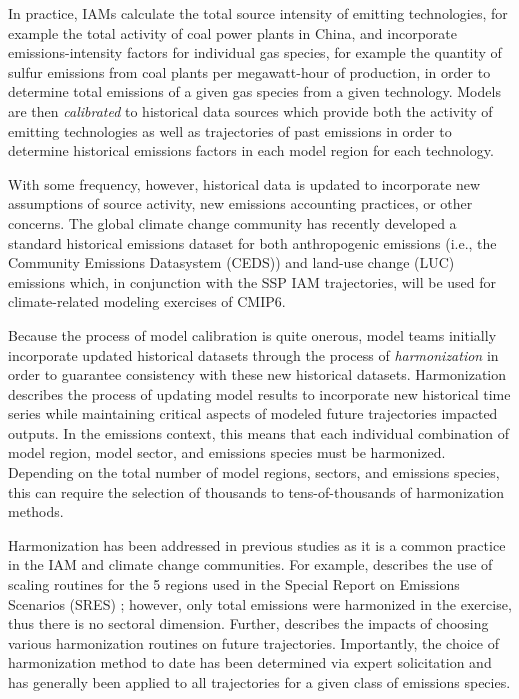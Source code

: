 In practice, IAMs calculate the total source intensity of emitting technologies,
for example the total activity of coal power plants in China, and incorporate
emissions-intensity factors for individual gas species, for example the quantity
of sulfur emissions from coal plants per megawatt-hour of production, in order
to determine total emissions of a given gas species from a given
technology. Models are then \textit{calibrated} to historical data sources which
provide both the activity of emitting technologies as well as trajectories of
past emissions in order to determine historical emissions factors in each model
region for each technology.

With some frequency, however, historical data is updated to incorporate new
assumptions of source activity, new emissions accounting practices, or other
concerns. The global climate change community has recently developed a standard
historical emissions dataset for both anthropogenic emissions (i.e., the
Community Emissions Datasystem (CEDS)) \cite{hoesly_historical_2017} and
land-use change (LUC) emissions \cite{van_marle_historic_2017} which, in
conjunction with the SSP IAM trajectories, will be used for climate-related
modeling exercises of CMIP6.

Because the process of model calibration is quite onerous, model teams initially
incorporate updated historical datasets through the process of
\textit{harmonization} in order to guarantee consistency with these new
historical datasets. Harmonization describes the process of updating model
results to incorporate new historical time series while maintaining critical
aspects of modeled future trajectories impacted outputs. In the emissions
context, this means that each individual combination of model region, model
sector, and emissions species must be harmonized. Depending on the total number
of model regions, sectors, and emissions species, this can require the selection
of thousands to tens-of-thousands of harmonization methods.

Harmonization has been addressed in previous studies as it is a common practice
in the IAM and climate change communities. For example,
\cite{meinshausen_rcp_2011} describes the use of scaling routines for the 5
regions used in the Special Report on Emissions Scenarios (SRES)
\cite{nakicenovic2000}; however, only total emissions were harmonized in the
exercise, thus there is no sectoral dimension. Further,
\cite{rogelj_discrepancies_2011} describes the impacts of choosing various
harmonization routines on future trajectories. Importantly, the choice of
harmonization method to date has been determined via expert solicitation and has
generally been applied to all trajectories for a given class of emissions
species.

